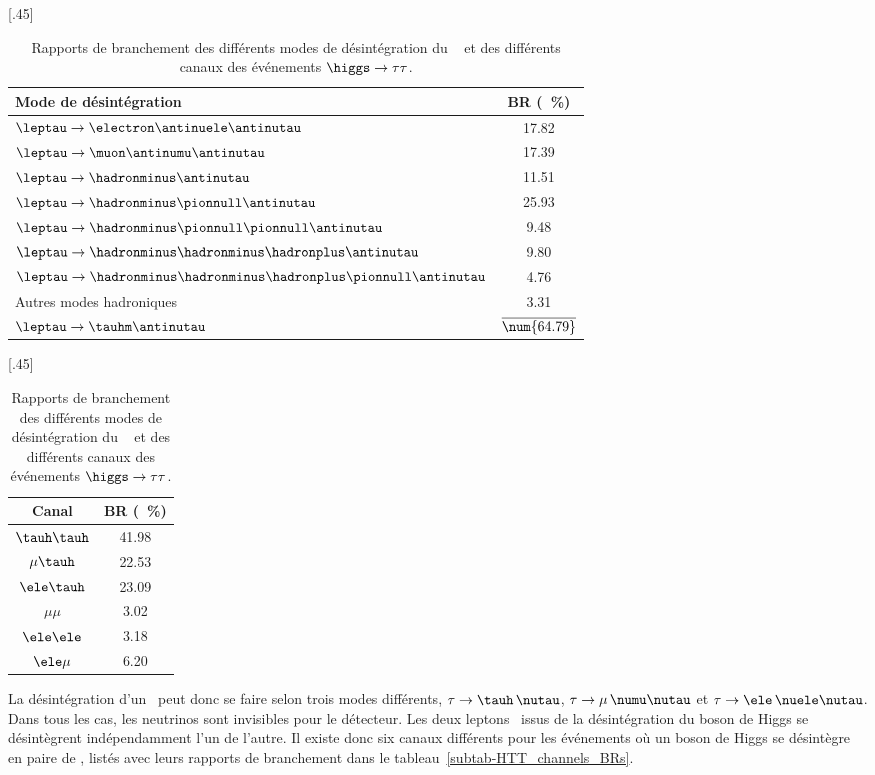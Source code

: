 \begin{table}[h]
\centering
{}[.45\textwidth]
{\begin{tabular}{lc}
\toprule
Mode de désintégration & BR (\SI{}{\%})\\
\midrule
$\leptau\to \electron\antinuele\antinutau$ & \num{17.82} \\
$\leptau\to \muon\antinumu\antinutau$ & \num{17.39} \\
\midrule
$\leptau\to \hadronminus \antinutau$ & \num{11.51} \\
$\leptau\to \hadronminus \pionnull \antinutau$ & \num{25.93} \\
$\leptau\to \hadronminus \pionnull\pionnull \antinutau$ & \num{9.48} \\
$\leptau\to \hadronminus \hadronminus\hadronplus \antinutau$ & \num{9.80} \\
$\leptau\to \hadronminus \hadronminus\hadronplus\pionnull\antinutau$ & \num{4.76} \\
Autres modes hadroniques & \num{3.31} \\
$\leptau\to \tauhm \antinutau$ & $\overline{\text{\num{64.79}}}$ \\
\bottomrule
\end{tabular}}
\hfill
{}[.45\textwidth]
{\begin{tabular}{cc}
\toprule
Canal & BR (\SI{}{\%})\\
\midrule
$\tauh\tauh$ & \num{41.98} \\
$\mu\tauh$ & \num{22.53} \\
$\ele\tauh$ & \num{23.09} \\
$\mu\mu$ & \num{3.02} \\
$\ele\ele$ & \num{3.18} \\
$\ele\mu$ & \num{6.20} \\
\bottomrule
\end{tabular}}
\caption[Rapports de branchement des événements $\higgs\to\tau\tau$.]{Rapports de branchement des différents modes de désintégration du \tau~\cite{PDG_booklet_2018} et des différents canaux des événements $\higgs\to\tau\tau$.}
\label{tab-tau_decay_and_HTT_channels_BRs}
\end{table}
\par La désintégration d'un \tau\ peut donc se faire selon trois modes différents, $\tau\to\tauh\,\nutau$, $\tau\to\mu\,\numu\nutau$ et $\tau\to\ele\,\nuele\nutau$.
Dans tous les cas, les neutrinos sont invisibles pour le détecteur.
Les deux leptons \tau\ issus de la désintégration du boson de Higgs se désintègrent indépendamment l'un de l'autre.
Il existe donc six canaux différents pour les événements où un boson de Higgs se désintègre en paire de \tau, listés avec leurs rapports de branchement dans le tableau~\ref{subtab-HTT_channels_BRs}.
